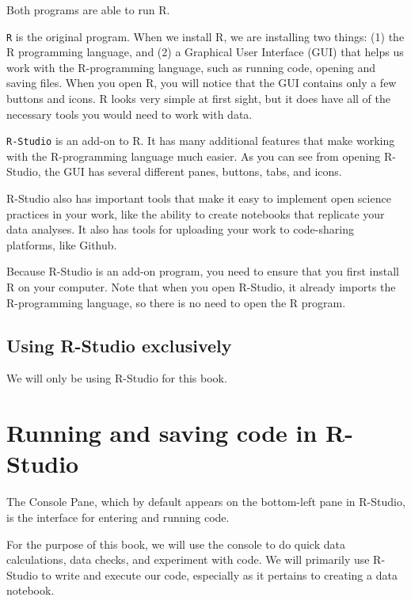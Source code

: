\documentclass[
]{book}
\begin{document}
Both programs are able to run R.

\texttt{R} is the original program. When we install R, we are installing two things: (1) the R programming language, and (2) a Graphical User Interface (GUI) that helps us work with the R-programming language, such as running code, opening and saving files. When you open R, you will notice that the GUI contains only a few buttons and icons. R looks very simple at first sight, but it does have all of the necessary tools you would need to work with data.

\texttt{R-Studio} is an add-on to R. It has many additional features that make working with the R-programming language much easier. As you can see from opening R-Studio, the GUI has several different panes, buttons, tabs, and icons.

R-Studio also has important tools that make it easy to implement open science practices in your work, like the ability to create notebooks that replicate your data analyses. It also has tools for uploading your work to code-sharing platforms, like Github.

Because R-Studio is an add-on program, you need to ensure that you first install R on your computer. Note that when you open R-Studio, it already imports the R-programming language, so there is no need to open the R program.

\hypertarget{using-r-studio-exclusively}{%
\subsection{Using R-Studio exclusively}\label{using-r-studio-exclusively}}

We will only be using R-Studio for this book.

\hypertarget{running-and-saving-code-in-r-studio}{%
\section{Running and saving code in R-Studio}\label{running-and-saving-code-in-r-studio}}

The Console Pane, which by default appears on the bottom-left pane in R-Studio, is the interface for entering and running code.

For the purpose of this book, we will use the console to do quick data calculations, data checks, and experiment with code. We will primarily use R-Studio to write and execute our code, especially as it pertains to creating a data notebook.
\end{document}
